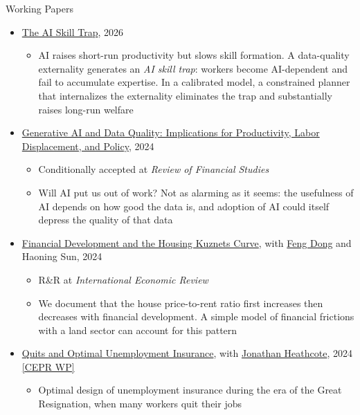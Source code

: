 \documentclass{resume} %
\begin{document}
\begin{rSection}{Working Papers}
	\begin{itemize}

		\item[--] \href{https://zhifeng-cai.github.io/papers/the_ai_skill_trap.pdf}{The AI Skill Trap}, 2026
		\begin{itemize}
			\item AI raises short-run productivity but slows skill formation. A data-quality externality generates an \emph{AI skill trap}: workers become AI-dependent and fail to accumulate expertise. In a calibrated model, a constrained planner that internalizes the externality eliminates the trap and substantially raises long-run welfare
		\end{itemize}

		\item[--] \href{https://zhifeng-cai.github.io/papers/draftqje_2024.pdf}{Generative AI and Data Quality: Implications for Productivity, Labor Displacement, and Policy}, 2024
		\begin{itemize}
			\item Conditionally accepted at \emph{Review of Financial Studies}
			\item Will AI put us out of work? Not as alarming as it seems: the usefulness of AI depends on how good the data is, and adoption of AI could itself depress the quality of that data
		\end{itemize}

		\item[--] \href{https://zhifeng-cai.github.io/papers/credit_land_bubble__2_.pdf}{Financial Development and the Housing Kuznets Curve}, with \href{https://fengdongecon.weebly.com/}{Feng Dong} and Haoning Sun, 2024
		\begin{itemize}
			\item R\&R at \emph{International Economic Review}
			\item We document that the house price-to-rent ratio first increases then decreases with financial development. A simple model of financial frictions with a land sector can account for this pattern
		\end{itemize}

		\item[--] \href{https://zhifeng-cai.github.io/papers/cai_heathcote_gr_clean.pdf}{Quits and Optimal Unemployment Insurance}, with \href{http://www.jonathanheathcote.com/}{Jonathan Heathcote}, 2024 \href{https://cepr.org/publications/dp18526}{[CEPR WP]}
		\begin{itemize}
			\item Optimal design of unemployment insurance during the era of the Great Resignation, when many workers quit their jobs
		\end{itemize}


\end{itemize}
\end{rSection}
\end{document}
